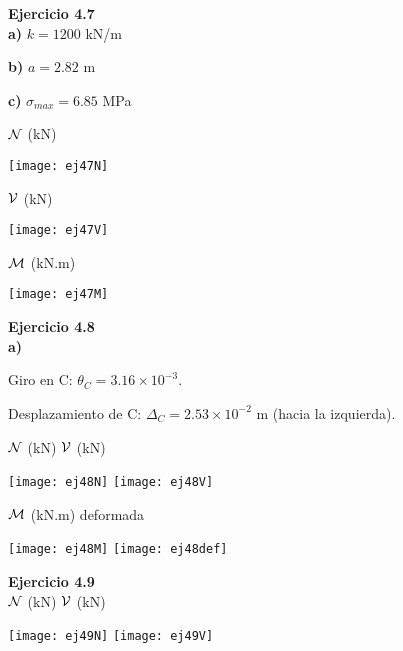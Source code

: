 \textbf{Ejercicio 4.7}\\

\textbf{a)} $k = 1200$ kN/m

\textbf{b)} $a = 2.82$ m

\textbf{c)} $\sigma_{max} = 6.85$  MPa

${\mathcal N}$ (kN)

\begin{center}
	\texttt{[image: ej47N]}
\end{center}

${\mathcal V}$ (kN)

\begin{center}
	\texttt{[image: ej47V]}
\end{center}

${\mathcal M}$ (kN.m)

\begin{center}
	\texttt{[image: ej47M]}
\end{center}

\textbf{Ejercicio 4.8}\\
\textbf{a)}

Giro en C: $\theta_C = 3.16 \times 10^{-3}$.

Desplazamiento de C: $\Delta_C = 2.53 \times 10^{-2}$ m (hacia la izquierda).

${\mathcal N}$ (kN) \hspace{0.4\textwidth} ${\mathcal V}$ (kN)
\begin{center}
	\texttt{[image: ej48N]}
	\texttt{[image: ej48V]}
\end{center}

${\mathcal M}$ (kN.m) \hspace{0.4\textwidth} deformada
\begin{center}
	\texttt{[image: ej48M]}
	\texttt{[image: ej48def]}
\end{center}

\textbf{Ejercicio 4.9}\\

${\mathcal N}$ (kN) \hspace{0.4\textwidth} ${\mathcal V}$ (kN)
\begin{center}
	\texttt{[image: ej49N]}
	\texttt{[image: ej49V]}
\end{center}

